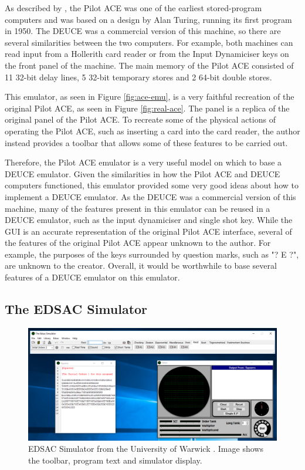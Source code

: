 \documentclass{l4proj}
\begin{document}
As described by \citet{VowelsAce05}, the Pilot ACE was one of the earliest stored-program computers and was based on a design by Alan Turing, running its first program in 1950. The DEUCE was a commercial version of this machine, so there are several similarities between the two computers. For example, both machines can read input from a Hollerith card reader or from the Input Dynamiciser keys on the front panel of the machine. The main memory of the Pilot ACE consisted of 11 32-bit delay lines, 5 32-bit temporary stores and 2 64-bit double stores.

This emulator, as seen in Figure \ref{fig:ace-emu}, is a very faithful recreation of the original Pilot ACE, as seen in Figure \ref{fig:real-ace}. The panel is a replica of the original panel of the Pilot ACE. To recreate some of the physical actions of operating the Pilot ACE, such as inserting a card into the card reader, the author instead provides a toolbar that allows some of these features to be carried out.

Therefore, the Pilot ACE emulator is a very useful model on which to base a DEUCE emulator. Given the similarities in how the Pilot ACE and DEUCE computers functioned, this emulator provided some very good ideas about how to implement a DEUCE emulator. As the DEUCE was a commercial version of this machine, many of the features present in this emulator can be reused in a DEUCE emulator, such as the input dynamiciser and single shot key. While the GUI is an accurate representation of the original Pilot ACE interface, several of the features of the original Pilot ACE appear unknown to the author. For example, the purposes of the keys surrounded by question marks, such as "? E ?", are unknown to the creator. Overall, it would be worthwhile to base several features of a DEUCE emulator on this emulator.


\subsection{The EDSAC Simulator}
\begin{figure}[h!]
	\centering
	\includegraphics[width=\linewidth]{images/edsac-emu}
	\caption{EDSAC Simulator from the University of Warwick \citep{Warwick16}. Image shows the toolbar, program text and simulator display.}
	\label{fig:edsac}
\end{figure}
\end{document}
